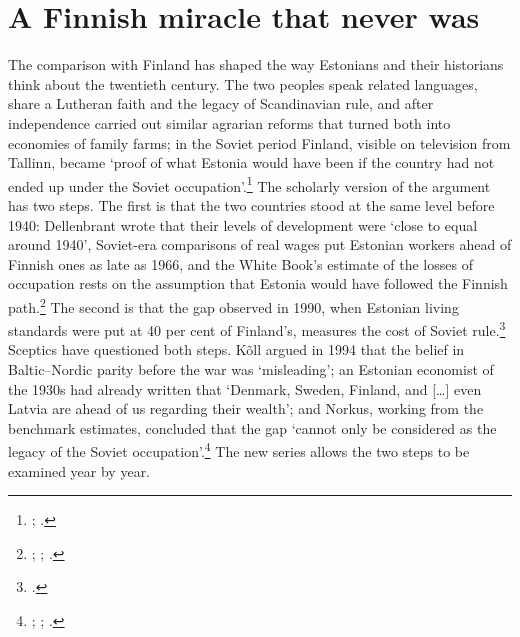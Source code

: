 \section{A Finnish miracle that never was}
\label{sec:finland}

The comparison with Finland has shaped the way Estonians and their historians think about the twentieth century. The two peoples speak related languages, share a Lutheran faith and the legacy of Scandinavian rule, and after independence carried out similar agrarian reforms that turned both into economies of family farms; in the Soviet period Finland, visible on television from Tallinn, became `proof of what Estonia would have been if the country had not ended up under the Soviet occupation'.\footnote{\autocite[82]{bocharnikova2021}; \autocite[83]{lepppantti2013}.} The scholarly version of the argument has two steps. The first is that the two countries stood at the same level before 1940: Dellenbrant wrote that their levels of development were `close to equal around 1940', Soviet-era comparisons of real wages put Estonian workers ahead of Finnish ones as late as 1966, and the White Book's estimate of the losses of occupation rests on the assumption that Estonia would have followed the Finnish path.\footnote{\autocite[206]{dellenbrant1992}; \autocite[251, 257]{klesment2009}; \autocite[141--74]{kukk2005}.} The second is that the gap observed in 1990, when Estonian living standards were put at 40 per cent of Finland's, measures the cost of Soviet rule.\footnote{\autocite[206]{dellenbrant1992}.} Sceptics have questioned both steps. Kõll argued in 1994 that the belief in Baltic--Nordic parity before the war was `misleading'; an Estonian economist of the 1930s had already written that `Denmark, Sweden, Finland, and [\ldots] even Latvia are ahead of us regarding their wealth'; and Norkus, working from the benchmark estimates, concluded that the gap `cannot only be considered as the legacy of the Soviet occupation'.\footnote{\autocite[201]{koll1994gap}; \autocite[131]{klesment2005}; \autocite[18]{norkus2016}.} The new series allows the two steps to be examined year by year.

